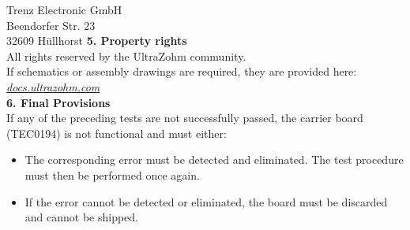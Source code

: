 \documentclass[
	fontsize=12pt,
	parskip=full,
	paper=A4,	
	fromalign=right,
	fromphone=false,
	fromemail=true,
	version=last,
	fromlogo=true,
]{scrlttr2}
\begin{document}
\begin{letter}{
	Trenz Electronic GmbH\\
	Beendorfer Str. 23\\
	32609 Hüllhorst
}
\textbf{5. Property rights}\\

All rights reserved by the UltraZohm community.\\

If schematics or assembly drawings are required, they are provided here: \href{https://docs.ultrazohm.com/hardware/carrier_board/carrier_board_rev04/overview.html#downloads}{\textit{docs.ultrazohm.com}} \\


\textbf{6. Final Provisions}\\

If any of the preceding tests are not successfully passed, the carrier board (TEC0194) is not functional and must either:
\begin{itemize}
    \item The corresponding error must be detected and eliminated. The test procedure must then be performed once again.
    \item If the error cannot be detected or eliminated, the board must be discarded and cannot be shipped.
\end{itemize} 
 

\closing{ }%


\end{letter}

%
\end{document}
